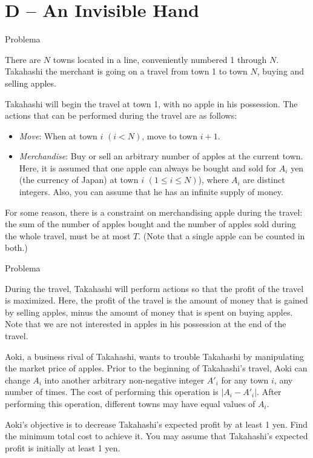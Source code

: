 \section{D -- An Invisible Hand}

\begin{frame}[fragile]{Problema}

There are $N$ towns located in a line, conveniently numbered 1 through $N$. Takahashi the 
merchant is going on a travel from town 1 to town $N$, buying and selling apples.

Takahashi will begin the travel at town 1, with no apple in his possession. The actions that 
can be performed during the travel are as follows:

\begin{itemize}
    \item \textit{Move}: When at town $i$ $(i < N)$, move to town $i + 1$.

    \item \textit{Merchandise}: Buy or sell an arbitrary number of apples at the current town. 
        Here, it is assumed that one apple can always be bought and sold for $A_i$ yen (the 
        currency of Japan) at town $i$ $(1\leq i\leq N)$), where $A_i$ are distinct integers. 
        Also, you can assume that he has an infinite supply of money.
\end{itemize}

For some reason, there is a constraint on merchandising apple during the travel: the sum of the 
number of apples bought and the number of apples sold during the whole travel, must be at most 
$T$. (Note that a single apple can be counted in both.)

\end{frame}


\begin{frame}[fragile]{Problema}

During the travel, Takahashi will perform actions so that the profit of the travel is maximized.
Here, the profit of the travel is the amount of money that is gained by selling apples, minus 
the amount of money that is spent on buying apples. Note that we are not interested in apples 
in his possession at the end of the travel.

Aoki, a business rival of Takahashi, wants to trouble Takahashi by manipulating the market 
price of apples. Prior to the beginning of Takahashi's travel, Aoki can change $A_i$ into 
another arbitrary non-negative integer $A'_i$ for any town $i$, any number of times. The cost 
of performing this operation is $|A_i - A'_i|$. After performing this operation, different 
towns may have equal values of $A_i$.

Aoki's objective is to decrease Takahashi's expected profit by at least 1 yen. Find the minimum 
total cost to achieve it. You may assume that Takahashi's expected profit is initially at least 
1 yen.

\end{frame}

